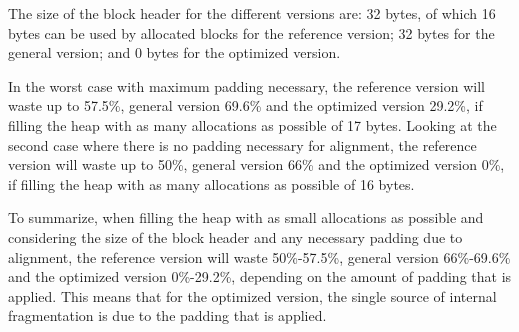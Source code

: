 The size of the block header for the different versions are: 32 bytes, of which 16 bytes can be used by allocated blocks for the reference version; 32 bytes for the general version; and 0 bytes for the optimized version. 

In the worst case with maximum padding necessary, the reference version will waste up to 57.5\%, general version 69.6\% and the optimized version 29.2\%, if filling the heap with as many allocations as possible of 17 bytes. Looking at the second case where there is no padding necessary for alignment, the reference version will waste up to 50\%, general version 66\% and the optimized version 0\%, if filling the heap with as many allocations as possible of 16 bytes.

To summarize, when filling the heap with as small allocations as possible and considering the size of the block header and any necessary padding due to alignment, the reference version will waste 50\%-57.5\%, general version 66\%-69.6\% and the optimized version 0\%-29.2\%, depending on the amount of padding that is applied. This means that for the optimized version, the single source of internal fragmentation is due to the padding that is applied.


